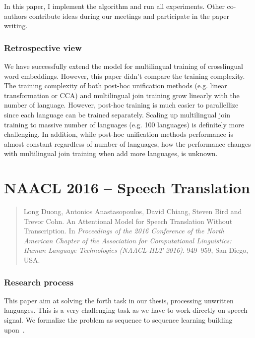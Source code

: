 \documentclass[12pt,twoside,final,hidelinks]{ltthesis}
\theoremstyle{definition}
\begin{document}
In this paper, I implement the algorithm and run all experiments. Other co-authors contribute ideas during our meetings and participate in the paper writing. 

\subsubsection{Retrospective view}
We have successfully extend the model for multilingual training of crosslingual word embeddings. However, this paper didn't compare the training complexity. 
The training complexity of both post-hoc unification methods (e.g. linear transformation or CCA) and multilingual join training grow linearly with the 
number of language. However, post-hoc training is much easier to parallellize since each language can be trained separately. Scaling up multilingual join 
training to massive number of languages (e.g. 100 languages) is definitely more challenging. In addition, while post-hoc unification methods performance 
is almost constant regardless of number of languages, how the performance changes with multilingual join training when add more languages, is unknown. 




\section{NAACL 2016 -- Speech Translation}
\label{sec:naacl16}
\begin{quote}
Long Duong, Antonios Anastasopoulos, David Chiang, Steven Bird and Trevor Cohn. An Attentional Model for Speech Translation Without Transcription. In\textit{ Proceedings of the 2016 Conference of the North American Chapter of the Association for Computational Linguistics: Human Language Technologies (NAACL-HLT 2016)}. 949--959, San Diego, USA.
\end{quote}

\subsubsection{Research process}
This paper aim at solving the forth task in our thesis, processing unwritten languages. This is a very challenging task as we have to work directly on speech 
signal. We formalize the problem as sequence to sequence learning building upon~. 
\end{document}
